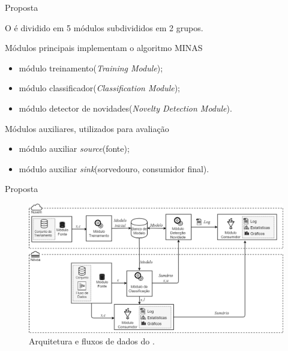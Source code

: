 \documentclass[aspectratio=43,10pt]{beamer}
\begin{document}
\newcommand{\source}{módulo auxiliar \emph{source}\xspace}
\newcommand{\sink}{módulo auxiliar \emph{sink}\xspace}

\newcommand{\offline}{módulo treinamento\xspace}
\newcommand{\classify}{módulo classificador\xspace}
\newcommand{\detector}{módulo detector de novidades\xspace}

\begin{frame}[fragile]{Proposta}

  O \mfog é dividido em 5 módulos subdivididos em 2 grupos.
  
  \begin{alertblock}{Módulos principais implementam o algoritmo MINAS}
    \begin{itemize}
      \item \offline (\emph{Training Module});
      \item \classify (\emph{Classification Module});
      \item \detector (\emph{Novelty Detection Module}).
    \end{itemize}
  \end{alertblock}
  \begin{alertblock}{Módulos auxiliares, utilizados para avaliação}
    \begin{itemize}
      \item \source (fonte);
      \item \sink (sorvedouro, consumidor final).
    \end{itemize}
  \end{alertblock}
\end{frame}

\begin{frame}[fragile]{Proposta}
  \vspace{-0.5cm}
  \begin{figure}[h]
    \centering
    \hspace*{-0.9cm}
    \includegraphics[width=1.1\textwidth]{../figuras/mfog-arch-v3_pt-br.png}
    \caption{Arquitetura e fluxos de dados do \mfog.}
    \label{fig:arch}
  \end{figure}
\end{frame}
\end{document}
